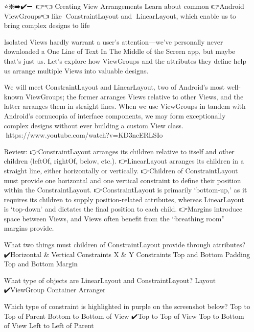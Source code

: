 ⭐❇️➡️✔️➖🔗💎👉👈
Creating View Arrangements
        Learn about common 👉Android ViewGroups👈 like 💎ConstraintLayout and 💎LinearLayout, which enable us to bring complex designs to life
            
        Isolated Views hardly warrant a user’s attention—we’ve personally never downloaded a One Line of Text In The Middle of the Screen app, but maybe that’s just us. Let’s explore how ViewGroups and the attributes they define help us arrange multiple Views into valuable designs.

        We will meet ConstraintLayout and LinearLayout, two of Android’s most well-known ViewGroups; the former arranges Views relative to other Views, and the latter arranges them in straight lines. When we use ViewGroups in tandem with Android’s cornucopia of interface components, we may form exceptionally complex designs without ever building a custom View class.
            🔗https://www.youtube.com/watch?v=KD3ncERLSIo

        Review:
            👉ConstraintLayout arranges its children relative to itself and other children (leftOf, rightOf, below, etc.). 
            👉LinearLayout arranges its children in a straight line, either horizontally or vertically.
            👉Children of ConstraintLayout must provide one horizontal and one vertical constraint to define their position within the ConstraintLayout.
            👉ConstraintLayout is primarily ‘bottom-up,’ as it requires its children to supply position-related attributes, whereas LinearLayout is ‘top-down’ and dictates the final position to each child.
            👉Margins introduce space between Views, and Views often benefit from the “breathing room” margins provide.

        What two things must children of ConstraintLayout provide through attributes?
            ✔️Horizontal & Vertical Constraints
            X & Y Constraints
            Top and Bottom Padding
            Top and Bottom Margin

        What type of objects are LinearLayout and ConstraintLayout?
            Layout
            ✔️ViewGroup
            Container
            Arranger

        Which type of constraint is highlighted in purple on the screenshot below?
            Top to Top of Parent
            Bottom to Bottom of View
            ✔️Top to Top of View
            Top to Bottom of View
            Left to Left of Parent